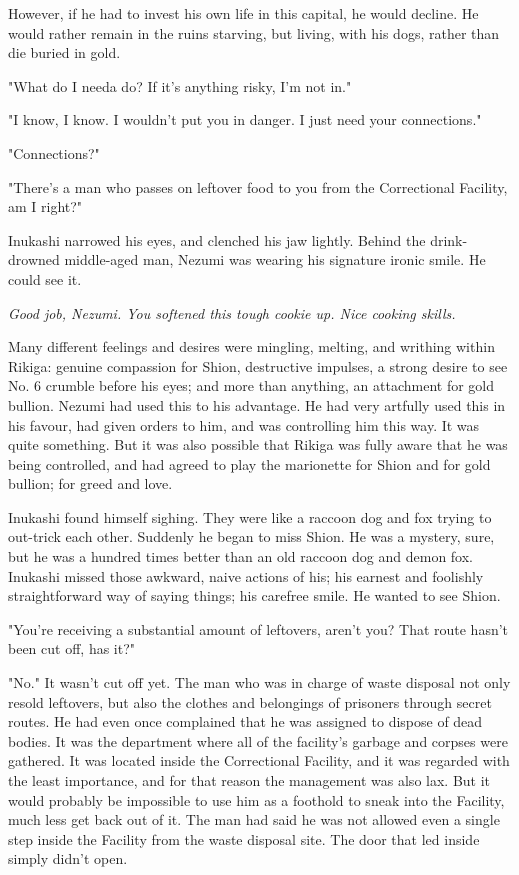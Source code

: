However, if he had to invest his own life in this capital, he would
decline. He would rather remain in the ruins starving, but living, with
his dogs, rather than die buried in gold.

"What do I needa do? If it's anything risky, I'm not in."

"I know, I know. I wouldn't put you in danger. I just need your
connections."

"Connections?"

"There's a man who passes on leftover food to you from the Correctional
Facility, am I right?"

Inukashi narrowed his eyes, and clenched his jaw lightly. Behind the
drink-drowned middle-aged man, Nezumi was wearing his signature ironic
smile. He could see it.

\emph{Good job, Nezumi. You softened this tough cookie up. Nice cooking
skills.}

Many different feelings and desires were mingling, melting, and writhing
within Rikiga: genuine compassion for Shion, destructive impulses, a
strong desire to see No. 6 crumble before his eyes; and more than
anything, an attachment for gold bullion. Nezumi had used this to his
advantage. He had very artfully used this in his favour, had given
orders to him, and was controlling him this way. It was quite something.
But it was also possible that Rikiga was fully aware that he was being
controlled, and had agreed to play the marionette for Shion and for gold
bullion; for greed and love.

Inukashi found himself sighing. They were like a raccoon dog and
fox trying to out-trick each other. Suddenly he began to miss
Shion. He was a mystery, sure, but he was a hundred times better than an
old raccoon dog and demon fox. Inukashi missed those awkward, naive
actions of his; his earnest and foolishly straightforward way of saying
things; his carefree smile. He wanted to see Shion.

"You're receiving a substantial amount of leftovers, aren't you? That
route hasn't been cut off, has it?"

"No." It wasn't cut off yet. The man who was in charge of waste disposal
not only resold leftovers, but also the clothes and belongings of
prisoners through secret routes. He had even once complained that he was
assigned to dispose of dead bodies. It was the department where all of
the facility's garbage and corpses were gathered. It was located inside
the Correctional Facility, and it was regarded with the least
importance, and for that reason the management was also lax. But it
would probably be impossible to use him as a foothold to sneak into the
Facility, much less get back out of it. The man had said he was not
allowed even a single step inside the Facility from the waste disposal
site. The door that led inside simply didn't open.

